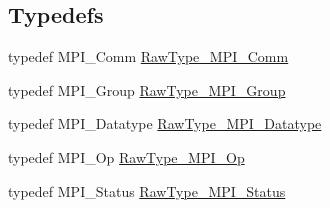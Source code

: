 \subsection*{Typedefs}
\begin{DoxyCompactItemize}
\item 
typedef M\-P\-I\-\_\-\-Comm \hyperlink{namespace_q_u_e_s_o_af48741a7e6d7897e9e96e0f5bb26cfd7}{Raw\-Type\-\_\-\-M\-P\-I\-\_\-\-Comm}
\item 
typedef M\-P\-I\-\_\-\-Group \hyperlink{namespace_q_u_e_s_o_acbf5b0ed9be4b77acd471b3914e128c6}{Raw\-Type\-\_\-\-M\-P\-I\-\_\-\-Group}
\item 
typedef M\-P\-I\-\_\-\-Datatype \hyperlink{namespace_q_u_e_s_o_a8648edf143b92c6f21f6cb93223b2cc9}{Raw\-Type\-\_\-\-M\-P\-I\-\_\-\-Datatype}
\item 
typedef M\-P\-I\-\_\-\-Op \hyperlink{namespace_q_u_e_s_o_ab6a4008f3ba2b0196dae9e41971a9c18}{Raw\-Type\-\_\-\-M\-P\-I\-\_\-\-Op}
\item 
typedef M\-P\-I\-\_\-\-Status \hyperlink{namespace_q_u_e_s_o_af3c313103c6396188748a1d534577ff7}{Raw\-Type\-\_\-\-M\-P\-I\-\_\-\-Status}
\end{DoxyCompactItemize}
